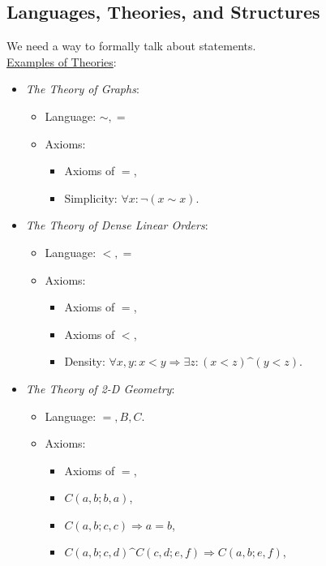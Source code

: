\documentclass{amsart}
\newcommand{\imp}{\Rightarrow}
\begin{document}
	\newpage 
	
%	
	
	\subsection{Languages, Theories, and Structures} We need a way to formally talk about statements.\\
	
	\underline{Examples of Theories}:
	\begin{itemize}
		\item \textit{The Theory of Graphs}: 
		\begin{itemize}
			\item Language: $\sim,=$
			\item Axioms: 
			\begin{itemize}
				\item Axioms of $=$,
				\item Simplicity: $\forall x: \neg (x\sim x)$.
			\end{itemize}
		\end{itemize}
		\item \textit{The Theory of Dense Linear Orders}:
		\begin{itemize}
			\item Language: $<,=$
			\item Axioms: 
			\begin{itemize}
				\item Axioms of $=$,
				\item Axioms of $<$,
				\item Density: $\forall x,y: x<y \imp \exists z: (x< z) \^ (y<z)$.
			\end{itemize}
		\end{itemize}
		\item \textit{The Theory of 2-D Geometry}:
		\begin{itemize}
			\item Language: $=,B,C$.
			\item Axioms:
			\begin{itemize}
				\item Axioms of $=$,
				\item $C(a,b;b,a)$,
				\item $C(a,b;c,c)\imp a=b$,
				\item $C(a,b;c,d) \^ C(c,d;e,f) \imp C(a,b;e,f)$,

\end{itemize}
\end{itemize}
\end{itemize}
\end{document}

